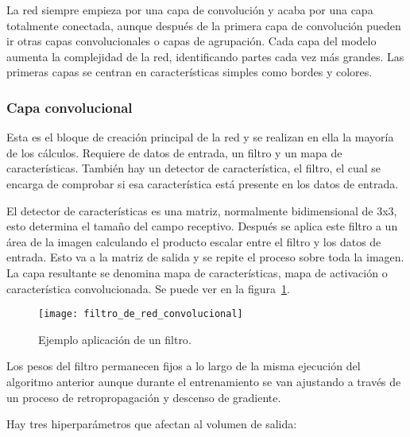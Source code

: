 La red siempre empieza por una capa de convolución y acaba por una capa totalmente conectada, aunque después de la primera capa de convolución pueden ir otras capas convolucionales o capas de agrupación. Cada capa del modelo aumenta la complejidad de la red, identificando partes cada vez más grandes. Las primeras capas se centran en características simples como bordes y colores. 

\subsubsection{Capa convolucional}
Esta es el bloque de creación principal de la red y se realizan en ella la mayoría de los cálculos. Requiere de datos de entrada, un filtro y un mapa de características. También hay un detector de característica, el filtro, el cual se encarga de comprobar si esa característica está presente en los datos de entrada.

El detector de características es una matriz, normalmente bidimensional de 3x3, esto determina el tamaño del campo receptivo. Después se aplica este filtro a un área de la imagen calculando el producto escalar entre el filtro y  los datos de entrada. Esto va a la matriz de salida y se repite el proceso sobre toda la imagen. La capa resultante se denomina mapa de características, mapa de activación o característica convolucionada. Se puede ver en la figura~\ref{fig:filtro}.

\begin{figure}[H]
	\centering
	\texttt{[image: filtro\_de\_red\_convolucional]}
	\caption[Ejemplo aplicación de un filtro.]{Ejemplo aplicación de un filtro\cite{cnn}.}
	\label{fig:filtro}
\end{figure}

Los pesos del filtro permanecen fijos a lo largo de la misma ejecución del algoritmo anterior aunque durante el entrenamiento se van ajustando a través de un proceso de retropropagación y descenso de gradiente.

Hay tres hiperparámetros que afectan al volumen de salida:

